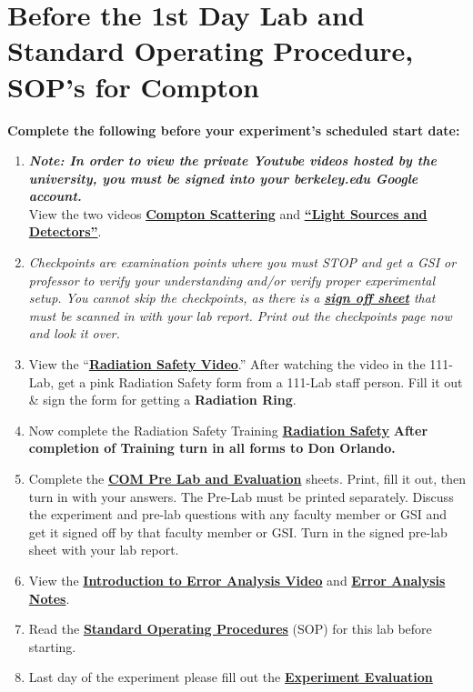 \documentclass{../lab}
\begin{document}
\section{Before the 1st Day Lab and Standard Operating Procedure, SOP's for Compton}
\label{sec:BeforeTheLab}

\textbf{Complete the following before your experiment's scheduled start date:}

\begin{enumerate}
    \item \emph{\textbf{Note: In order to view the private Youtube videos hosted by the university, you must be signed into your berkeley.edu Google account.}} \\
    View the two videos \href{http://youtu.be/PVgqyf3kNRs}{\textbf{Compton Scattering}} and \href{http://youtu.be/lQKLakISoBA}{\textbf{``Light Sources and Detectors''}}.

    \item \emph{Checkpoints are examination points where you must STOP and get a GSI or professor to verify your understanding and/or verify proper experimental setup. You cannot skip the checkpoints, as there is a \href{http://experimentationlab.berkeley.edu/node/132}{\textbf{sign off sheet}} that must be scanned in with your lab report. Print out the checkpoints page now and look it over.}

    \item View the ``\href{http://youtu.be/KHxtzF5pZZM}{\textbf{Radiation Safety Video}}.'' After watching the video in the 111-Lab, get a pink Radiation Safety form from a 111-Lab staff person. Fill it out \& sign the form for getting a \textbf{Radiation Ring}.

    \item Now complete the Radiation Safety Training \href{http://experimentationlab.berkeley.edu/RadiationSafety}{\textbf{Radiation Safety}} \textbf{After completion of Training turn in all forms to Don Orlando.}

    \item Complete the \href{http://experimentationlab.berkeley.edu/COMPreLab}{\textbf{COM Pre Lab and Evaluation}} sheets. Print, fill it out, then turn in with your answers. The Pre-Lab must be printed separately. Discuss the experiment and pre-lab questions with any faculty member or GSI and get it signed off by that faculty member or GSI. Turn in the signed pre-lab sheet with your lab report.

    \item View the \href{\ErrorAnalysisVideo}{\textbf{Introduction to Error Analysis Video}} and \href{\ErrorAnalysisNotes}{\textbf{\textbf{Error Analysis Notes}}}.

    \item Read the \href{http://experimentationlab.berkeley.edu/sites/default/files/images/SOP\_3271\_Cs-137\_Na-22\_Co-60\_Mn-54\_Am-241\_Fe-55\_2014.pdf}{\textbf{Standard Operating Procedures}} (SOP) for this lab before starting.

    \item Last day of the experiment please fill out the \href{\ExperimentEvaluation}{\textbf{Experiment Evaluation}}

\end{enumerate}
\end{document}
